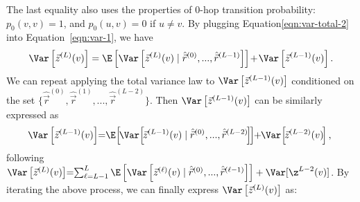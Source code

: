 The last equality also uses the properties of $0$-hop transition probability:  $p_0(v,v)=1$, and  $p_0(u,v)=0$ if $u \neq v$. By plugging Equation\eqref{eqn:var-total-2} into Equation~\eqref{eqn:var-1}, we have
\begin{equation}\nonumber%
	\begin{aligned}
		\Var \left[ \vec{z}^{(L)}(v)\right]
		= \E \left[ \Var \left[\vec{z}^{(L)}(v) \mid \hat{\vec{r}}^{(0)},...,\hat{\vec{r}}^{(L-1)}\right]\right]
		\hspace{-0.5mm}+\hspace{-0.5mm}\Var \left[ \vec{z}^{(L-1)}(v) \right]. 
	\end{aligned}
\end{equation}
We can repeat applying the total variance law to $\Var \left[ \vec{z}^{(L-1)}(v) \right]$ conditioned on the set $\{\hat{\vec{r}}^{(0)},\hat{\vec{r}}^{(1)},...,\hat{\vec{r}}^{(L-2)}\}$. Then $\Var \left[\vec{z}^{(L-1)}(v)\right]$ can be similarly expressed as
\begin{equation}\nonumber
\begin{aligned}
\hspace{-1mm}\Var \left[\vec{z}^{(L-1)}(v)\right]\hspace{-1mm}=\hspace{-1mm}\E \hspace{-0.5mm} \left[\hspace{-0.5mm} \Var \hspace{-0.5mm}\left[\hspace{-0.5mm} \vec{z}^{(L-1)}(v) \mid \hat{\vec{r}}^{(0)},...,\hat{\vec{r}}^{(L-2)}\hspace{-0.5mm}\right]\hspace{-0.5mm}\right]\hspace{-1mm}+\hspace{-1mm}\Var \hspace{-0.5mm}\left[\hspace{-0.5mm} \vec{z}^{(L-2)}(v)\hspace{-0.5mm}\right], 
\end{aligned}
\end{equation}
following $\Var \left[ \vec{z}^{(L)}(v)\right]\hspace{-1mm}=\hspace{-1mm}\sum_{\ell=L-1}^L \E \left[\Var \left[\vec{z}^{(\ell)}(v)\mid \hat{\vec{r}}^{(0)},...,\hat{\vec{r}}^{(\ell-1)}\right]\right]+\Var [\z^{L-2}(v)]$. By iterating the above process, we can finally express $\Var \left[ \vec{z}^{(L)}(v)\right]$ as: 
\vspace{-2mm}
